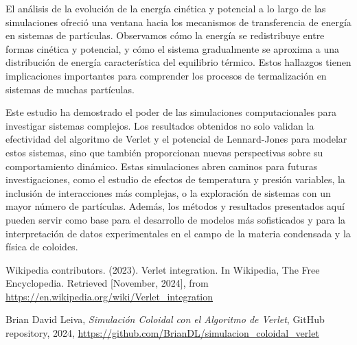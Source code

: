 \documentclass[twocolumn]{article}
\begin{document}
El análisis de la evolución de la energía cinética y potencial a lo largo de las simulaciones ofreció una ventana hacia los mecanismos de transferencia de energía en sistemas de partículas. Observamos cómo la energía se redistribuye entre formas cinética y potencial, y cómo el sistema gradualmente se aproxima a una distribución de energía característica del equilibrio térmico. Estos hallazgos tienen implicaciones importantes para comprender los procesos de termalización en sistemas de muchas partículas.

Este estudio ha demostrado el poder de las simulaciones computacionales para investigar sistemas complejos. Los resultados obtenidos no solo validan la efectividad del algoritmo de Verlet y el potencial de Lennard-Jones para modelar estos sistemas, sino que también proporcionan nuevas perspectivas sobre su comportamiento dinámico. Estas simulaciones abren caminos para futuras investigaciones, como el estudio de efectos de temperatura y presión variables, la inclusión de interacciones más complejas, o la exploración de sistemas con un mayor número de partículas. Además, los métodos y resultados presentados aquí pueden servir como base para el desarrollo de modelos más sofisticados y para la interpretación de datos experimentales en el campo de la materia condensada y la física de coloides.

\begin{thebibliography}{9}
        
 Wikipedia contributors. (2023). Verlet integration. In Wikipedia, The Free Encyclopedia. Retrieved [November, 2024], from \url{https://en.wikipedia.org/wiki/Verlet_integration}

Brian David Leiva,
\emph{Simulación Coloidal con el Algoritmo de Verlet},
GitHub repository,
2024,
\url{https://github.com/BrianDL/simulacion_coloidal_verlet}
    
\end{thebibliography}
\end{document}
